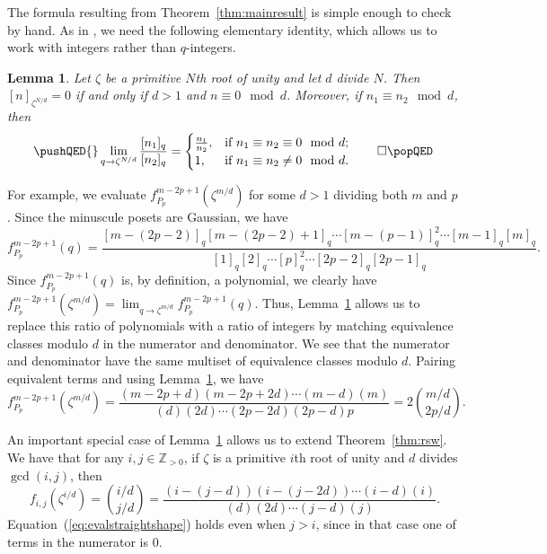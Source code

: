 \documentclass[12pt]{amsart}
\newtheorem{lemma}[theorem]{Lemma}
\theoremstyle{definition}
\theoremstyle{remark}
\numberwithin{equation}{section}
\begin{document}
The formula resulting from Theorem~\ref{thm:mainresult} is simple enough to check by hand. 
As in \cite[Proof of Theorem 7.1]{Reiner.Stanton.White}, we need the following elementary identity, which allows us to work with integers rather than $q$-integers. 


\begin{lemma}\label{lem:evalq}
Let $\zeta$ be a primitive $N$th root of unity and let $d$ divide $N$. Then $[n]_{\zeta^{N/d}} = 0$ if and only if $d>1$ and $n \equiv 0 \mod d$. Moreover, if $n_1 \equiv n_2 \mod d$, then 
\begin{equation}\label{eq:evalq}
\pushQED{\qed}
\lim \limits_{q \rightarrow \zeta^{N/d}} \frac{[n_1]_q}{[n_2]_q} = 
\begin{cases}
\frac{n_1}{n_2}, &\text{if }  n_1 \equiv n_2 \equiv 0 \mod d; \\
1, &\text{if } n_1 \equiv n_2 \neq 0 \mod d.
\end{cases} \qedhere \popQED
\end{equation}
\end{lemma}

For example, we evaluate $f^{m-2p+1}_{P_p}(\zeta^{m/d})$ for some $d > 1$ dividing both $m$ and $p$. Since the minuscule posets are Gaussian, we have
\tiny
\[   f^{m-2p+1}_{P_p}(q) = \frac{[m-(2p-2)]_{q}[m-(2p-2)+1]_{q} \cdots [m-(p-1)]_{q}^2 \cdots [m-1]_{q}[m]_{q}}{[1]_{q}[2]_{q} \cdots [p]_{q}^2 \cdots [2p-2]_{q}[2p-1]_{q}}. \]
\normalsize
Since $f^{m-2p+1}_{P_p}(q)$ is, by definition, a polynomial, we clearly have $f^{m-2p+1}_{P_p}(\zeta^{m/d}) = \lim_{q \rightarrow \zeta^{m/d}} f^{m-2p+1}_{P_p}(q)$.
Thus, Lemma~\ref{lem:evalq} allows us to replace this ratio of polynomials with a ratio of integers by matching equivalence classes modulo $d$ in the numerator and denominator. We see that the numerator and denominator have the same multiset of equivalence classes modulo $d$. Pairing equivalent terms and using Lemma~\ref{lem:evalq}, we have
\[ f^{m-2p+1}_{P_p}(\zeta^{m/d}) = \frac{(m-2p+d)(m-2p+2d) \cdots  (m-d)(m)}{(d) (2d)\cdots  (2p-2d)(2p-d) p} = 2 \binom{m/d}{2p/d}.\]     

An important special case of Lemma~\ref{lem:evalq} allows us to extend Theorem~\ref{thm:rsw}. We have that for any $i, j \in \mathbb{Z}_{> 0}$, if $\zeta$ is a primitive $i$th root of unity and $d$ divides $\gcd(i,j)$, then
\begin{equation}~\label{eq:evalstraightshape}
f_{i,j}(\zeta^{i/d}) = \binom{i/d}{j/d} = \frac{(i-(j-d))(i-(j-2d)) \cdots  (i-d)(i)}{(d)  (2d)  \cdots  (j-d) (j)}. 
\end{equation}
Equation~(\ref{eq:evalstraightshape}) holds even when $j > i$, since in that case one of terms in the numerator is $0$. 
\end{document}
